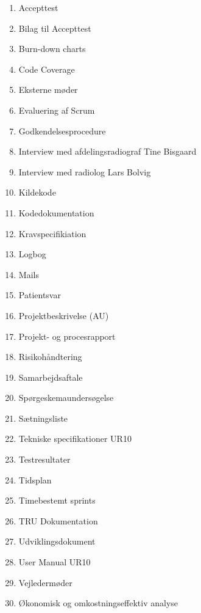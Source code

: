 \begin{enumerate}
\item Accepttest 					 					\label{Accepttest}
\item Bilag til Accepttest								\label{BilagAccepttest}
\item Burn-down charts									\label{BurnDown}
\item Code Coverage 									\label{Code Coverage}
\item Eksterne møder									\label{Eksterne moder} 
\item Evaluering af Scrum 								\label{Evaluering Scrum} 
\item Godkendelsesprocedure 							\label{Godkendelsesprocedure}
\item Interview med afdelingsradiograf Tine Bisgaard 	\label{Tine}
\item Interview med radiolog Lars Bolvig  				\label{Telefoninterview}
\item Kildekode											\label{Kildekode}
\item Kodedokumentation 								\label{Kodedokumentation} 
\item Kravspecifikiation 								\label{Kravspecifikation}
\item Logbog											\label{Logbog}
\item Mails												\label{Mails}
\item Patientsvar										\label{Patientsvar} 
\item Projektbeskrivelse (AU) 							\label{Projektbeskrivelse}
\item Projekt- og procesrapport 						\label{Projekt- og procesrapport}
\item Risikohåndtering 									\label{Risikohandtering} 
\item Samarbejdsaftale									\label{Samarbejdsaftale} 
\item Spørgeskemaundersøgelse 							\label{Sporgeskemaundersogelse}
\item Sætningsliste 									\label{Satningsliste}
\item Tekniske specifikationer UR10						\label{UR10spec}
\item Testresultater 									\label{TestResultater}
\item Tidsplan											\label{Tidsplan}
\item Timebestemt sprints 								\label{Timebestemt sprints}
\item TRU Dokumentation 								\label{TRUDokumentation}
\item Udviklingsdokument 								\label{Udviklingsdokument}
\item User Manual UR10 									\label{UserManualUR10}
\item Vejledermøder										\label{Vejledermoder}
\item Økonomisk og omkostningseffektiv analyse			\label{Okonomi}
\end{enumerate}

